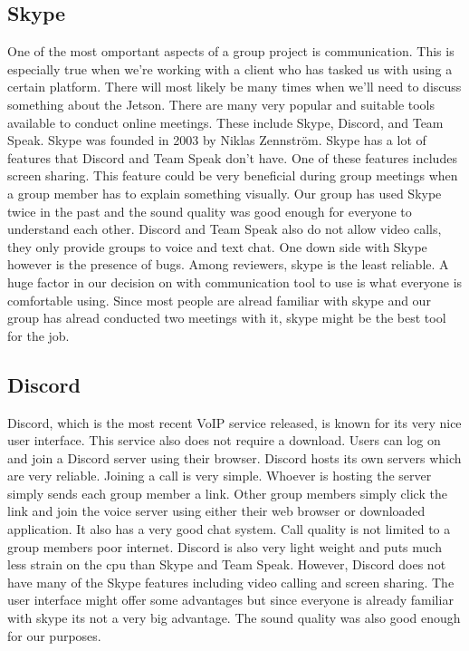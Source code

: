 \documentclass{scrreprt}
\begin{document}
\subsection{Skype}
One of the most omportant aspects of a group project is communication.
This is especially true when we're working with a client who has tasked us with using a certain platform.
There will most likely be many times when we'll need to discuss something about the Jetson.
There are many very popular and suitable tools available to conduct online meetings.
These include Skype, Discord, and Team Speak.
Skype was founded in 2003 by Niklas Zennström.
Skype has a lot of features that Discord and Team Speak don't have.
One of these features includes screen sharing.
This feature could be very beneficial during group meetings when a group member has to explain something visually.
Our group has used Skype twice in the past and the sound quality was good enough for everyone to understand each other.
Discord and Team Speak also do not allow video calls, they only provide groups to voice and text chat.
One down side with Skype however is the presence of bugs.
Among reviewers, skype is the least reliable.
A huge factor in our decision on with communication tool to use is what everyone is comfortable using.
Since most people are alread familiar with skype and our group has alread conducted two meetings with it, skype might be the best tool for the job.

\subsection{Discord}
Discord, which is the most recent VoIP service released, is known for its very nice user interface.
This service also does not require a download.
Users can log on and join a Discord server using their browser.
Discord hosts its own servers which are very reliable.
Joining a call is very simple.
Whoever is hosting the server simply sends each group member a link.
Other group members simply click the link and join the voice server using either their web browser or downloaded application.
It also has a very good chat system.
Call quality is not limited to a group members poor internet.
Discord is also very light weight and puts much less strain on the cpu than Skype and Team Speak.
However, Discord does not have many of the Skype features including video calling and screen sharing.
The user interface might offer some advantages but since everyone is already familiar with skype its not a very big advantage.
The sound quality was also good enough for our purposes.
\end{document}
